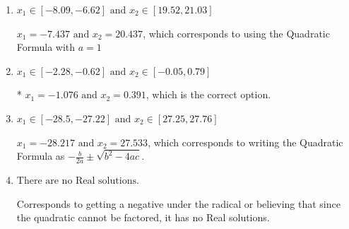 \documentclass{extbook}[14pt]
\begin{document}
\begin{enumerate}
{\begin{enumerate}[label=\Alph*.]
 $x_1 = -0.391 \text{ and } x_2 = 1.076$, which corresponds to writing the Quadratic Formula as $\frac{b \pm \sqrt{b^2 - 4ac}}{2a}$
\item \( x_1 \in [-8.09, -6.62] \text{ and } x_2 \in [19.52, 21.03] \)

 $x_1 = -7.437 \text{ and } x_2 = 20.437$, which corresponds to using the Quadratic Formula with $a=1$
\item \( x_1 \in [-2.28, -0.62] \text{ and } x_2 \in [-0.05, 0.79] \)

* $x_1 = -1.076 \text{ and } x_2 = 0.391$, which is the correct option.
\item \( x_1 \in [-28.5, -27.22] \text{ and } x_2 \in [27.25, 27.76] \)

 $x_1 = -28.217 \text{ and } x_2 = 27.533$, which corresponds to writing the Quadratic Formula as $-\frac{b}{2a} \pm \sqrt{b^2 - 4ac}$.
\item \( \text{There are no Real solutions.} \)

Corresponds to getting a negative under the radical or believing that since the quadratic cannot be factored, it has no Real solutions.
\end{enumerate}

}
\end{enumerate}
\end{document}

